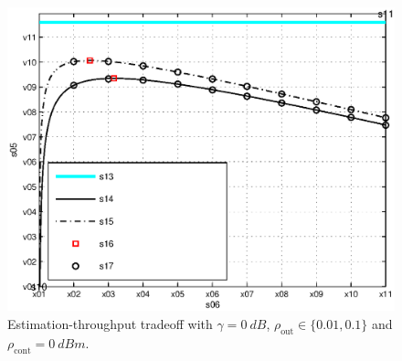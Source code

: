 \documentclass[12pt, draftclsnofoot, onecolumn]{IEEEtran}
\newcommand{\sub}[1]{_{\text{#1}}}
\newcommand{\opc}{\rho\sub{out}}
\newcommand{\pc}{\rho\sub{cont}}
\newcommand{\ptran}{P\sub{tran}}
\newcommand{\ite}{\theta\sub{I}}
\newcommand{\gp}{h\sub{p}}
\newcommand{\gs}{h\sub{s}}
\newcommand{\nps}{\sigma^2}
\newcommand{\fsam}{f\sub{s}}
\newcommand{\Ks}{N\sub{s}}
\newcommand{\figscale}{0.80 \columnwidth}
\newcommand{\figscale}{0.45 \columnwidth}
\begin{document}




\begin{figure}[!t]
\vspace{-6mm}

\centering
\includegraphics[width= \figscale]{figures/fig_thr_est_time_tradeoff_AWGN}
\vspace{-4mm}
\caption{Estimation-throughput tradeoff with $\gamma = \SI{0}{dB}$, $\opc \in \{0.01, 0.1\}$ and $\pc = \SI{0}{dBm}$.}
\label{fig:ETT}
\vspace{-10mm}
\end{figure}
\end{document}
